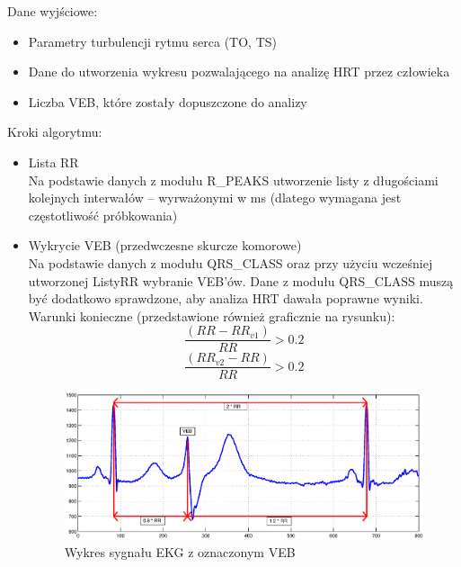 Dane wyjściowe:
\begin{itemize}
\item Parametry turbulencji rytmu serca (TO, TS)
\item Dane do utworzenia wykresu pozwalającego na analizę HRT przez człowieka
\item Liczba VEB, które zostały dopuszczone do analizy \\

\end{itemize}

Kroki algorytmu:
\begin{itemize}
\item Lista RR\\
Na podstawie danych z modułu R\_PEAKS utworzenie listy z długościami kolejnych interwałów – wyrważonymi w ms (dlatego wymagana jest częstotliwość próbkowania)
\item Wykrycie VEB (przedwczesne skurcze komorowe) \\
Na podstawie danych z modułu QRS\_CLASS oraz przy użyciu wcześniej utworzonej ListyRR wybranie VEB’ów.
 Dane z modułu QRS\_CLASS muszą być dodatkowo sprawdzone, aby analiza HRT dawała poprawne wyniki.
 Warunki konieczne (przedstawione również graficznie na rysunku):\\
\begin{equation} \frac{(RR-RR_{v1})}{RR}>0.2 \end{equation}
\begin{equation} \frac{(RR_{v2} - RR)}{RR} > 0.2 \end{equation}
\begin{figure}[!ht]
\centerline{\includegraphics[scale=0.42]{HRT/HRT5.eps}}
\caption{Wykres sygnału EKG z oznaczonym VEB}
\end{figure}


\end{itemize}
